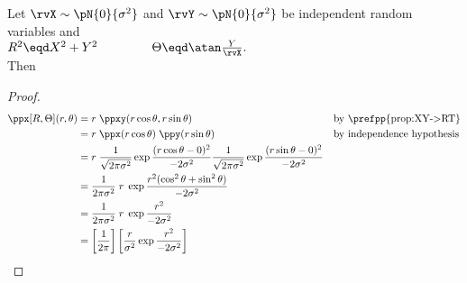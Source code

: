 \begin{proposition}
\label{prop:XY->RT_n}
Let $\rvX\sim\pN{0}{\sigma^2}$ and $\rvY\sim\pN{0}{\sigma^2}$ be
independent random variables and
\\\indentx$R^2 \eqd X^2 + Y^2 \hspace{10ex} \Theta \eqd \atan\frac{Y}{\rvX}.$\\
Then
\end{proposition}
\begin{proof}
\begin{align*}
  \ppx[R,\Theta](r,\theta)
    &= r\;\ppxy(r\cos\theta,r\sin\theta)
    && \text{by \prefpp{prop:XY->RT}}
  \\&= r\;\ppx(r\cos\theta) \; \ppy(r\sin\theta)
    && \text{by independence hypothesis}
  \\&= r\;
       \frac{1}{\sqrt{2\pi\sigma^2}}\exp{\frac{(r\cos\theta-0)^2}{-2\sigma^2}}
       \frac{1}{\sqrt{2\pi\sigma^2}}\exp{\frac{(r\sin\theta-0)^2}{-2\sigma^2}}
  \\&= \frac{1}{2\pi\sigma^2}\;r\;
       \exp{\frac{r^2(\cos^2\theta + \sin^2\theta)}{-2\sigma^2}}
  \\&= \frac{1}{2\pi\sigma^2}\;r\;
       \exp{\frac{r^2}{-2\sigma^2}}
  \\&= \left[\frac{1}{2\pi}\right]
       \left[\frac{r}{\sigma^2}\exp{\frac{r^2}{-2\sigma^2}}\right]
\end{align*}
\end{proof}


